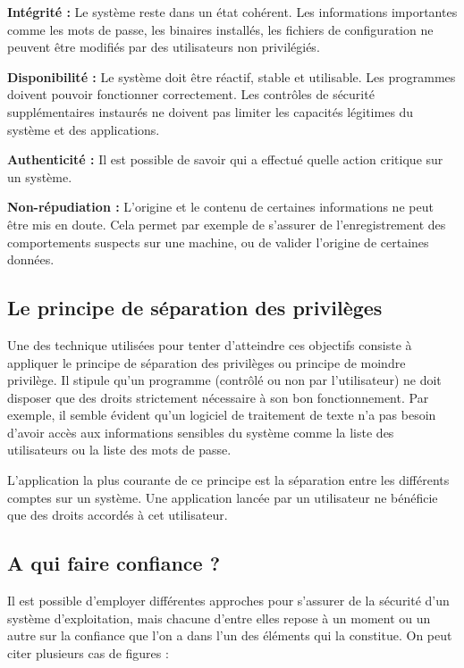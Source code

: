 \textbf{Intégrité :}
Le système reste dans un état cohérent. Les informations importantes comme les mots de passe, les binaires installés, les fichiers de configuration ne peuvent être modifiés par des utilisateurs non privilégiés.

\textbf{Disponibilité :}
Le système doit être réactif, stable et utilisable. Les programmes doivent pouvoir fonctionner correctement. Les contrôles de sécurité supplémentaires instaurés ne doivent pas limiter les capacités légitimes du système et des applications.

\textbf{Authenticité :}
Il est possible de savoir qui a effectué quelle action critique sur un système.

\textbf{Non-répudiation :}
L'origine et le contenu de certaines informations ne peut être mis en doute. Cela permet par exemple de s'assurer de l'enregistrement des comportements suspects sur une machine, ou de valider l'origine de certaines données.

\subsection{Le principe de séparation des privilèges}

Une des technique utilisées pour tenter d'atteindre ces objectifs consiste à appliquer le principe de séparation des privilèges ou principe de moindre privilège. Il stipule qu'un programme (contrôlé ou non par l'utilisateur) ne doit disposer que des droits strictement nécessaire à son bon fonctionnement. Par exemple, il semble évident qu'un logiciel de traitement de texte n'a pas besoin d'avoir accès aux informations sensibles du système comme la liste des utilisateurs ou la liste des mots de passe.

L'application la plus courante de ce principe est la séparation entre les différents comptes sur un système. Une application lancée par un utilisateur ne bénéficie que des droits accordés à cet utilisateur.

\subsection{A qui faire confiance ?}

Il est possible d'employer différentes approches pour s'assurer de la sécurité d'un système d'exploitation, mais chacune d'entre elles repose à un moment ou un autre sur la confiance que l'on a dans l'un des éléments qui la constitue. On peut citer plusieurs cas de figures \cite{WCS}:


